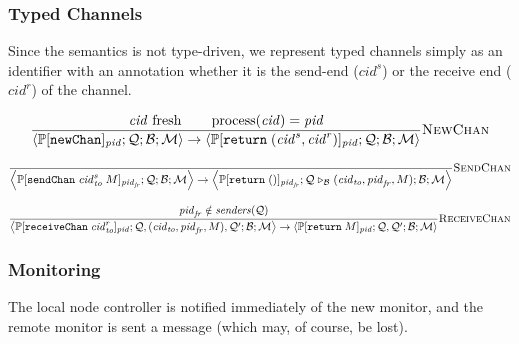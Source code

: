 \documentclass{article}
\newcommand{\sReturn}{\mathtt{return}}
\newcommand{\sNewChan}{\mathtt{newChan}}
\newcommand{\sSendChan}{\mathtt{sendChan}}
\newcommand{\sReceiveChan}{\mathtt{receiveChan}}
\DeclareMathOperator{\sProcessOf}{process}
\newcommand{\sExtend}[1]{\mathrel{\triangleright_{#1}}}
\newcommand{\sPid}{\ensuremath{\mathit{pid}}}
\newcommand{\sCid}{\ensuremath{\mathit{cid}}}
\newcommand{\sSystem}[4]{\left\langle #1 ; #2 ; #3 ; #4 \right\rangle}
\newcommand{\sQueue}{\mathcal{Q}}
\newcommand{\sBlacklist}{\mathcal{B}}
\newcommand{\sMonitors}{\mathcal{M}}
\newcommand{\sCtxt}[1]{\mathbb{#1}}
\newcommand{\sSenders}{\mathit{senders}}
\begin{document}
\subsubsection{Typed Channels}

Since the semantics is not type-driven, we represent typed channels simply as
an identifier with an annotation whether it is the send-end ($\sCid^s$) or the
receive end ($\sCid^r$) of the channel.

\begin{equation*}
\frac{
  \sCid \text{ fresh}
\qquad
  \sProcessOf(\sCid) = \sPid
}{
  \sSystem{\sCtxt{P}[\sNewChan]_\sPid}
          {\sQueue}
          {\sBlacklist}
          {\sMonitors}
\rightarrow
  \sSystem{\sCtxt{P}[\sReturn \; (\sCid^s, \sCid^r)]_\sPid}
          {\sQueue}
          {\sBlacklist}
          {\sMonitors}
} \textsc{NewChan}
\end{equation*}

\begin{equation*}
\frac{
}{
  \sSystem{\sCtxt{P}[ \sSendChan \; \sCid_\mathit{to}^s \; M ]_{\sPid_\mathit{fr}}}
          {\sQueue}
          {\sBlacklist}
          {\sMonitors}
\rightarrow 
  \sSystem{\sCtxt{P}[ \sReturn \; () ]_{\sPid_\mathit{fr}}}
          {\sQueue \sExtend{\sBlacklist} (\sCid_\mathit{to}, \sPid_\mathit{fr}, M)}
          {\sBlacklist}
          {\sMonitors}
} \textsc{SendChan}
\end{equation*}

\begin{equation*}
\frac{
  \sPid_{\mathit{fr}} \notin \sSenders(\sQueue)
}{
  \sSystem{\sCtxt{P}[ \sReceiveChan \; \sCid_\mathit{to}^r ]_{\sPid}}
          {\sQueue, (\sCid_\mathit{to}, \sPid_\mathit{fr}, M), \sQueue'}
          {\sBlacklist}
          {\sMonitors}
\rightarrow
  \sSystem{\sCtxt{P}[ \sReturn \; M ]_{\sPid}}
          {\sQueue, \sQueue'}
          {\sBlacklist}
          {\sMonitors}
} \textsc{ReceiveChan}
\end{equation*}

\subsubsection{Monitoring}

The local node controller is notified immediately of the new monitor, and the
remote monitor is sent a message (which may, of course, be lost). 
\end{document}
